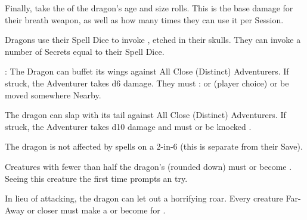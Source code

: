\begin{multicols}{2}
\begin{multicols*}{2}

Finally, take the \SUM of the dragon's age and size rolls.  This is the base damage for their breath weapon, as well as how many times they can use it per Session.

\newpage

\end{multicols*}



\footnotesize \Asterisk Dragons use their Spell Dice to invoke , etched in their skulls. They can invoke a number of Secrets equal to their Spell Dice.
\normalsize



 :  The Dragon can buffet its wings against All Close (Distinct) Adventurers.  If struck, the Adventurer takes d6 damage.  They must \RS : \VIG or \DEX (player choice) or be moved somewhere Nearby.


 The dragon can slap with its tail against All Close (Distinct) Adventurers.  If struck, the Adventurer takes d10 damage and must \RSTRY{\DEX} or be knocked .


   The dragon is not affected by spells on a 2-in-6 (this is separate from their Save).


   Creatures with fewer than half the dragon's \HD (rounded down) must  or become .  Seeing this creature the first time prompts an \INSANITY try.


  In lieu of attacking, the dragon can let out a horrifying roar.  Every creature Far-Away or closer must make a  or become  for .
 


\end{multicols}
